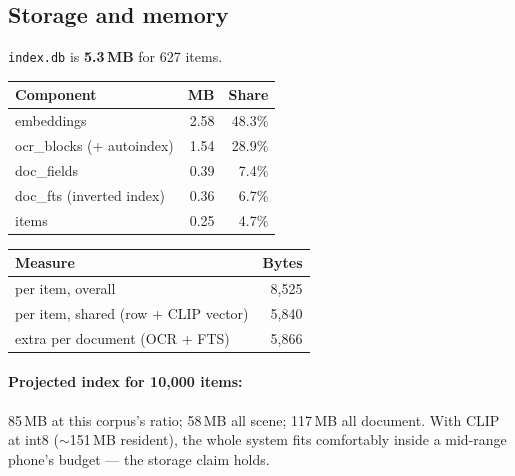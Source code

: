 \documentclass[11pt,a4paper]{article}
\newcommand{\code}[1]{\texttt{\small #1}}
\begin{document}
\begin{center}
\end{center}

\subsection{Storage and memory}
\label{sec:storage}

\code{index.db} is \textbf{5.3\,MB} for 627 items.

\begin{center}
\begin{tabular}{@{}lrr@{}}
\toprule
\textbf{Component} & \textbf{MB} & \textbf{Share} \\
\midrule
embeddings                 & 2.58 & 48.3\% \\
ocr\_blocks (+ autoindex)  & 1.54 & 28.9\% \\
doc\_fields                & 0.39 & 7.4\% \\
doc\_fts (inverted index)  & 0.36 & 6.7\% \\
items                      & 0.25 & 4.7\% \\
\bottomrule
\end{tabular}
\hspace{0.8em}
\begin{tabular}{@{}lr@{}}
\toprule
\textbf{Measure} & \textbf{Bytes} \\
\midrule
per item, overall                      & 8{,}525 \\
per item, shared (row + CLIP vector)   & 5{,}840 \\
extra per document (OCR + FTS)         & 5{,}866 \\
\bottomrule
\end{tabular}
\end{center}

\paragraph{Projected index for 10{,}000 items:}
85\,MB at this corpus's ratio; 58\,MB all scene; 117\,MB all document. With CLIP
at int8 ($\sim$151\,MB resident), the whole system fits comfortably inside a
mid-range phone's budget --- the storage claim holds.
\end{document}
